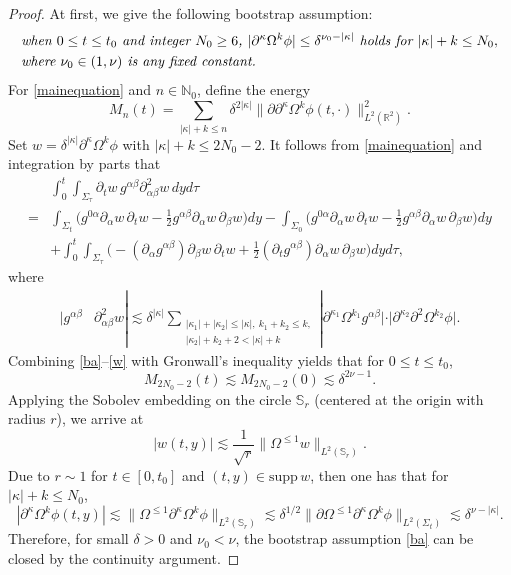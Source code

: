 \documentclass[10pt,a4paper]{amsart}
\begin{document}
\begin{proof}
At first, we give the following bootstrap assumption:
\begin{equation}\label{ba}
\begin{split}
&\text{\it when $0\leq t\leq t_0$ and integer $N_0\ge 6$,
$|\partial^\kappa\Omega^k\phi|\leq\delta^{\nu_0-|\kappa|}$ holds for $|\kappa|+k\leq N_0$},\\
&\text{\it where $\nu_0\in(1, \nu)$ is any fixed constant.}
\end{split}
\end{equation}
For \eqref{mainequation} and $n\in\mathbb N_0$, define the energy
$$
M_n(t)=\sum_{|\kappa|+k\leq n}\delta^{2|\kappa|}\|\partial\partial^\kappa\Omega^k\phi(t,\cdot)\|_{L^2(\mathbb R^2)}^2.
$$
Set $w=\delta^{|\kappa|}\partial^\kappa\Omega^k\phi$ with $|\kappa|+k\leq 2N_0-2$.
It follows from \eqref{mainequation} and integration by parts that
\begin{equation}\label{Y-4}
\begin{split}
&\int_0^t\int_{\Sigma_\tau}\partial_t w\,g^{\alpha\beta}\partial_{\alpha\beta}^2 w\,dyd\tau\\
=&\int_{\Sigma_{t}}\big(g^{0\alpha}\partial_\alpha w\,\partial_t w
-\frac12g^{\alpha\beta}\partial_\alpha w\,\partial_\beta w\big)dy
-\int_{\Sigma_{0}}\big(g^{0\alpha}\partial_\alpha w\,\partial_t w
-\frac12g^{\alpha\beta}\partial_\alpha w\,\partial_\beta w\big)dy\\
&+\int_0^t\int_{\Sigma_\tau}\big(-(\partial_\alpha g^{\alpha\beta})\partial_\beta w\,\partial_t w
+\frac12(\partial_t g^{\alpha\beta})\partial_\alpha w\,\partial_\beta w\big)dyd\tau,
\end{split}
\end{equation}
where
\begin{equation}\label{w}
\begin{split}
|g^{\alpha\beta}&\partial_{\alpha\beta}^2w|
\lesssim\delta^{|\kappa|}\sum_{\substack{
|\kappa_1|+|\kappa_2|\leq|\kappa|,\ k_1+k_2\leq k,\\
|\kappa_2|+k_2+2<|\kappa|+k}}
|\partial^{\kappa_1}\Omega^{k_1}g^{\alpha\beta}|
\cdot|\partial^{\kappa_2}\partial^2\Omega^{k_2}\phi|.
\end{split}
\end{equation}
Combining \eqref{ba}--\eqref{w} with Gronwall's inequality yields that for $0\leq t\leq t_0$,
$$
M_{2N_0-2}(t)\lesssim M_{2N_0-2}(0)\lesssim\delta^{2\nu-1}.
$$
Applying the Sobolev embedding on the circle $\mathbb S_r$ (centered at the origin with radius $r$), we arrive at
$$
|w(t,y)|\lesssim \frac{1}{\sqrt{r}}\|\Omega^{\le 1}w\|_{L^2(\mathbb S_r)}.
$$
Due to $r\sim 1$ for $t\in[0,t_0]$ and $(t,y)\in\mathrm{supp}\,w$, then one has that for $|\kappa|+k\leq N_0$,
\begin{equation}\label{local}
|\partial^\kappa\Omega^k\phi(t,y)|
\lesssim \|\Omega^{\le 1}\partial^\kappa\Omega^k\phi\|_{L^2(\mathbb S_r)}
\lesssim\delta^{1/2}\|\partial\Omega^{\le 1}\partial^\kappa\Omega^k\phi\|_{L^2(\Sigma_{t})}
\lesssim\delta^{\nu-|\kappa|}.
\end{equation}
Therefore, for small $\delta>0$ and $\nu_0<\nu$, the bootstrap assumption \eqref{ba} can be closed by the continuity argument.



\end{proof}
\end{document}
